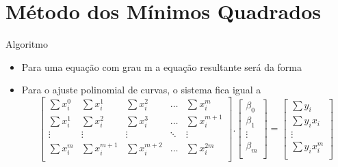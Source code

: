 \documentclass[10pt]{beamer}
\begin{document}
\section{Método dos Mínimos Quadrados}
\begin{frame}[fragile]{Algoritmo}
  \begin{itemize}
  \item Para uma equação com grau m a equação resultante será da forma 
  \newline
  \item Para o ajuste polinomial de curvas, o sistema fica
igual a   
  \newline
  \[
    \begin{bmatrix}
      \sum{x_{i}^{0}} & \sum{x_{i}^{1}} & \sum{x_{i}^{2}} & \dots  & \sum{x_{i}^{m}} \\
      \sum{x_{i}^{1}} & \sum{x_{i}^{2}} & \sum{x_{i}^{3}} & \dots & \sum{x_{i}^{m+1}}\\
      \vdots & \vdots & \vdots & \ddots & \vdots \\
      \sum{x_{i}^{m}} & \sum{x_{i}^{m+1}} & \sum{x_{i}^{m+2}} & \dots  & \sum{x_{i}^{2m}} \\
    \end{bmatrix}
    .
    \begin{bmatrix}
      \beta_0 \\
      \beta_1 \\
      \vdots  \\
      \beta_m \\
    \end{bmatrix}
    =
    \begin{bmatrix}
      \sum{y_{i}} \\
      \sum{y_{i}x_{i}}\\
      \vdots \\
      \sum{y_{i}x_{i}^{m}} \\
    \end{bmatrix}
    \]
  \newline
  \end{itemize}
\end{frame}
\end{document}
